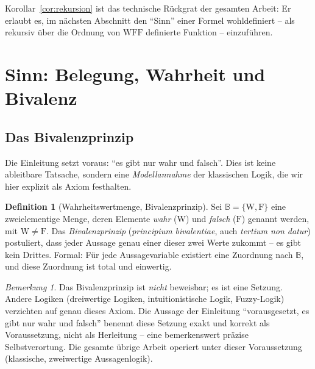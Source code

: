 \documentclass[12pt, a4paper]{article}
\theoremstyle{definition}
\newtheorem{definition}[theorem]{Definition}
\theoremstyle{remark}
\newtheorem{remark}[theorem]{Bemerkung}
\newcommand{\W}{\mathrm{W}}
\newcommand{\F}{\mathrm{F}}
\newcommand{\WFF}{\mathrm{WFF}}
\begin{document}
Korollar~\ref{cor:rekursion} ist das technische Rückgrat der gesamten Arbeit: Er erlaubt es, im nächsten Abschnitt den ``Sinn'' einer Formel wohldefiniert -- als rekursiv über die Ordnung von $\WFF$ definierte Funktion -- einzuführen.

\section{Sinn: Belegung, Wahrheit und Bivalenz}
\label{sec:semantik}

\subsection{Das Bivalenzprinzip}
\label{subsec:bivalenz}

Die Einleitung setzt voraus: ``es gibt nur wahr und falsch''. Dies ist keine ableitbare Tatsache, sondern eine \emph{Modellannahme} der klassischen Logik, die wir hier explizit als Axiom festhalten.

\begin{definition}[Wahrheitswertmenge, Bivalenzprinzip]
\label{def:bivalenzprinzip}
Sei $\mathbb{B} = \{\W, \F\}$ eine zweielementige Menge, deren Elemente \emph{wahr} ($\W$) und \emph{falsch} ($\F$) genannt werden, mit $\W \ne \F$. Das \emph{Bivalenzprinzip} (\emph{principium bivalentiae}, auch \emph{tertium non datur}) postuliert, dass jeder Aussage genau einer dieser zwei Werte zukommt -- es gibt kein Drittes. Formal: Für jede Aussagevariable existiert eine Zuordnung nach $\mathbb{B}$, und diese Zuordnung ist total und einwertig.
\end{definition}

\begin{remark}
\label{rem:bivalenz_ist_axiom}
Das Bivalenzprinzip ist \emph{nicht} beweisbar; es ist eine Setzung. Andere Logiken (dreiwertige Logiken, intuitionistische Logik, Fuzzy-Logik) verzichten auf genau dieses Axiom. Die Aussage der Einleitung ``vorausgesetzt, es gibt nur wahr und falsch'' benennt diese Setzung exakt und korrekt als Voraussetzung, nicht als Herleitung -- eine bemerkenswert präzise Selbstverortung. Die gesamte übrige Arbeit operiert unter dieser Voraussetzung (klassische, zweiwertige Aussagenlogik).
\end{remark}
\end{document}
